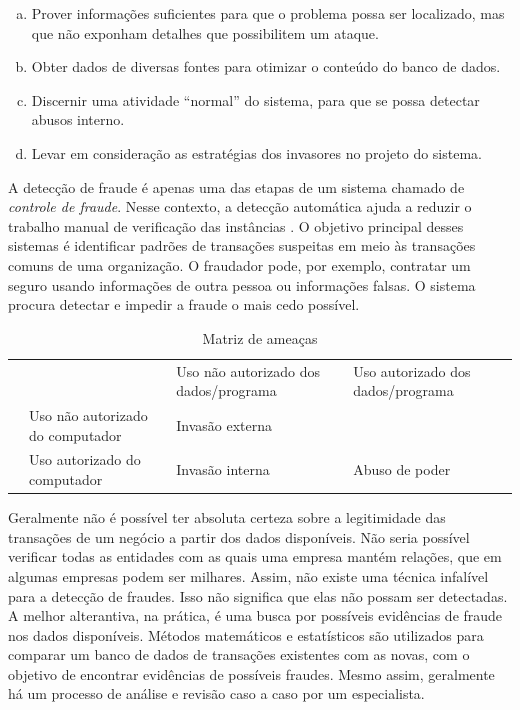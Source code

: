 \begin{enumerate}[a)]
    \item Prover informações suficientes para que o problema possa ser localizado, mas que não exponham detalhes que possibilitem um ataque.
    \item Obter dados de diversas fontes para otimizar o conteúdo do banco de dados.
    \item Discernir uma atividade ``normal'' do sistema, para que se possa detectar abusos interno.
    \item Levar em consideração as estratégias dos invasores no projeto do sistema.
\end{enumerate}

A detecção de fraude é apenas uma das etapas de um sistema chamado de \emph{controle de fraude}. Nesse contexto, a detecção automática ajuda a reduzir o trabalho manual de verificação das instâncias \cite{Phua2010}. O objetivo principal desses sistemas é identificar padrões de transações suspeitas em meio às transações comuns de uma organização. O fraudador pode, por exemplo, contratar um seguro usando informações de outra pessoa ou informações falsas. O sistema procura detectar e impedir a fraude o mais cedo possível.

\renewcommand{\arraystretch}{1.5}
\begin{table}[h!]
    \vspace{1cm}
    \caption{Matriz de ameaças \cite{Anderson1972}}
    \centering
    \begin{tabular}{c p{4cm}|>{\centering\arraybackslash}p{4cm}|>{\centering\arraybackslash}p{4cm}|}
        \cline{3-4}
        & & Uso não autorizado dos dados/programa & Uso autorizado dos dados/programa \\
        \hhline{~---}
        \multicolumn{0}{c|}{} & Uso não autorizado do computador & Invasão externa & \cellcolor{gray!90} \\
        \cline{2-4}
        \multicolumn{0}{c|}{} & Uso autorizado do computador & Invasão interna & Abuso de poder \\
        \cline{2-4}
    \end{tabular}
    \label{fraud:and}
    \vspace{1cm}
\end{table}

Geralmente não é possível ter absoluta certeza sobre a legitimidade das transações de um negócio a partir dos dados disponíveis. Não seria possível verificar todas as entidades com as quais uma empresa mantém relações, que em algumas empresas podem ser milhares. Assim, não existe uma técnica infalível para a detecção de fraudes. Isso não significa que elas não possam ser detectadas. A melhor alterantiva, na prática, é uma busca por possíveis evidências de fraude nos dados disponíveis. Métodos matemáticos e estatísticos são utilizados para comparar um banco de dados de transações existentes com as novas, com o objetivo de encontrar evidências de possíveis fraudes. Mesmo assim, geralmente há um processo de análise e revisão caso a caso por um especialista.

